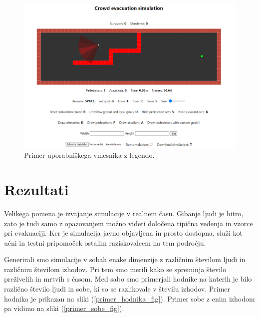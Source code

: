\documentclass[9pt]{pnas-new}
\begin{document}
\begin{figure}
	\centering
	\includegraphics[scale=0.4]{fig/uporabniski_vmesnik_razsirjen.png}
	\caption{Primer uporabniškega vmesnika z legendo.}
	\label{uporabniski_vmesnik_fig}
\end{figure}




\section*{Rezultati}
Velikega pomena je izvajanje simulacije v realnem času. Gibanje ljudi je hitro, zato je tudi samo z opazovanjem možno videti določena tipična vedenja in vzorce pri evakuaciji. Ker je simulacija javno objavljena in prosto dostopna, služi kot učni in testni pripomoček ostalim raziskovalcem na tem področju.

Generirali smo simulacije v sobah enake dimenzije z različnim številom ljudi in različnim številom izhodov. Pri tem smo merili kako se spreminja število preživelih in mrtvih s časom. Med sabo smo primerjali hodnike na katerih je bilo različno število ljudi in sobe, ki so se razlikovale v številu izhodov. Primer hodnika je prikazan na sliki (\ref{primer_hodnika_fig}). Primer sobe z enim izhodom pa vidimo na sliki (\ref{primer_sobe_fig}).
\end{document}
